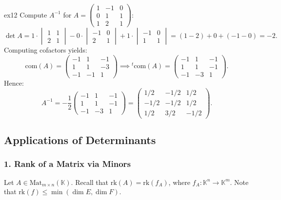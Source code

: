 \documentclass[11pt, a4paper]{article}
\newcommand{\K}{\mathbb{K}}
\begin{document}
\begin{example}{}{ex12}
  Compute $A^{-1}$ for $A = \begin{pmatrix} 1 & -1 & 0 \\ 0 & 1 & 1 \\ 1 & 2 & 1 \end{pmatrix}$:
  \[
    \det A = 1 \cdot \begin{vmatrix} 1 & 1 \\ 2 & 1 \end{vmatrix} - 0 \cdot \begin{vmatrix} -1 & 0 \\ 2 & 1 \end{vmatrix} + 1 \cdot \begin{vmatrix} -1 & 0 \\ 1 & 1 \end{vmatrix} = (1 - 2) + 0 + (-1 - 0) = -2.
  \]
  Computing cofactors yields:
  \[
    \text{com}(A) = \begin{pmatrix} -1 & 1 & -1 \\ 1 & 1 & -3 \\ -1 & -1 & 1 \end{pmatrix} \implies {}^t\text{com}(A) = \begin{pmatrix} -1 & 1 & -1 \\ 1 & 1 & -1 \\ -1 & -3 & 1 \end{pmatrix}.
  \]
  Hence:
  \[
    A^{-1} = -\frac{1}{2} \begin{pmatrix} -1 & 1 & -1 \\ 1 & 1 & -1 \\ -1 & -3 & 1 \end{pmatrix} = \begin{pmatrix} 1/2 & -1/2 & 1/2 \\ -1/2 & -1/2 & 1/2 \\ 1/2 & 3/2 & -1/2 \end{pmatrix}.
  \]
\end{example}

\subsection{Applications of Determinants}

\subsubsection*{1. Rank of a Matrix via Minors}

Let $A \in \text{Mat}_{m \times n}(\K)$. Recall that $\text{rk}(A) = \text{rk}(f_A)$, where $f_A: \K^n \to \K^m$.
Note that $\text{rk}(f) \le \min(\dim E, \dim F)$.
\end{document}
